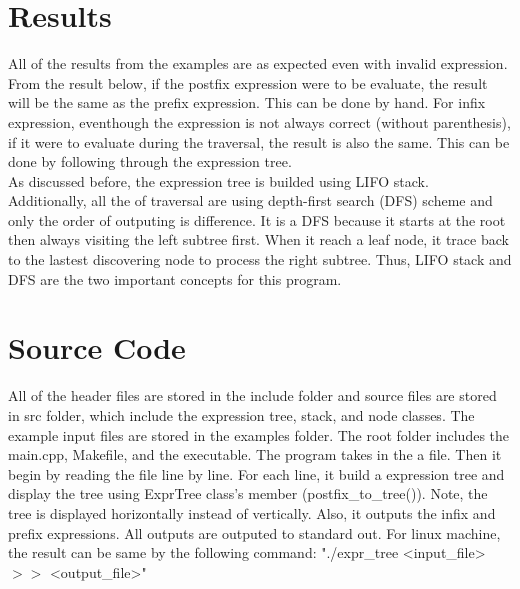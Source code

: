 \documentclass[11pt]{article}
\begin{document}
\section{Results}
All of the results from the examples are as expected even with invalid expression.
From the result below, if the postfix expression were to be evaluate, the result will be the same as the prefix expression.
This can be done by hand.
For infix expression, eventhough the expression is not always correct (without parenthesis), if it were to evaluate during the traversal, the result is also the same.
This can be done by following through the expression tree.\\

As discussed before, the expression tree is builded using LIFO stack.
Additionally, all the of traversal are using depth-first search (DFS) scheme and only the order of outputing is difference.
It is a DFS because it starts at the root then always visiting the left subtree first.
When it reach a leaf node, it trace back to the lastest discovering node to process the right subtree.
Thus, LIFO stack and DFS are the two important concepts for this program.


\section{Source Code}
All of the header files are stored in the include folder and source files are stored in src folder, which include the expression tree, stack, and node classes.
The example input files are stored in the examples folder.
The root folder includes the main.cpp, Makefile, and the executable.
The program takes in the a file.
Then it begin by reading the file line by line.
For each line, it build a expression tree and display the tree using ExprTree class's member (postfix\_to\_tree()).
Note, the tree is displayed horizontally instead of vertically.
Also, it outputs the infix and prefix expressions.
All outputs are outputed to standard out.
For linux machine, the result can be same by the following command: "./expr\_tree <input\_file> $>>$ <output\_file>"
\end{document}
